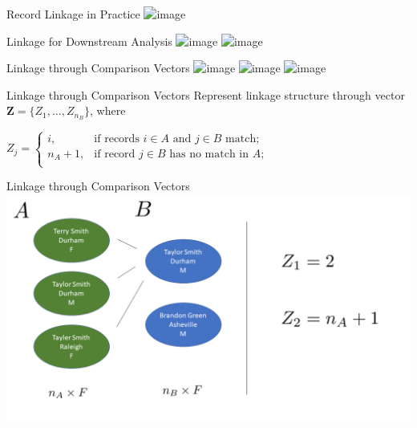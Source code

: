 \documentclass{beamer}
\begin{document}
\begin{frame}{Record Linkage in Practice}
	\centering
	\includegraphics<1->[width = .8\textwidth, height = .6\textwidth ]{graphics/syria_article_big.png}
\end{frame}

\begin{frame}{Linkage for Downstream Analysis}
	\includegraphics<1>[width = \textwidth, height = .7\textwidth ]{graphics/Slide1.png}
	\includegraphics<2>[width = \textwidth, height = .7\textwidth ]{graphics/Slide2.png}
\end{frame}

\begin{frame}{Linkage through Comparison Vectors}
	\includegraphics<1>[width = \textwidth, height = .6\textwidth ]{graphics/Slide3.png}
	\includegraphics<2>[width = \textwidth, height = .6\textwidth ]{graphics/Slide4.png}
	\includegraphics<3>[width = \textwidth, height = .6\textwidth ]{graphics/Slide5.png}
\end{frame}

\begin{frame}{Linkage through Comparison Vectors}
	Represent linkage structure through vector $\mathbf{Z} = \{Z_1, \ldots, Z_{n_B}\}$, where
\begin{center}
	$Z_j = \begin{cases} 
		i,  & \text{if records } i\in A \text{ and } j\in B \text{ match}; \\
		n_A + 1,  & \text{if record } j\in B \text{ has no match in } A; \\
	\end{cases}$
\end{center}
\end{frame}

\begin{frame}{Linkage through Comparison Vectors}
	\includegraphics[width = \textwidth, height = .6\textwidth ]{graphics/Slide6.png}
\end{frame}
\end{document}
